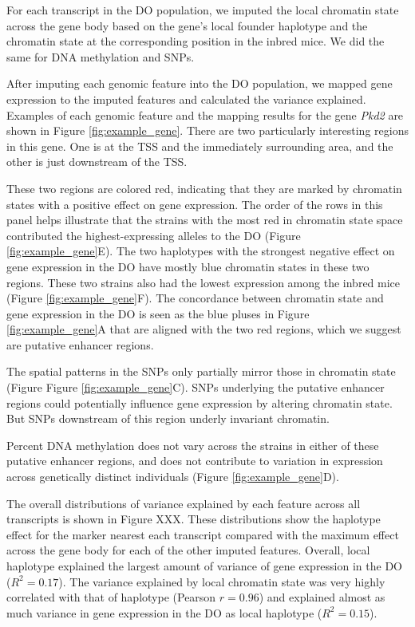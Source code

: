 \documentclass[10pt,letterpaper]{article}
\begin{document}
For each transcript in the DO population, we imputed the local chromatin
state across the gene body based on the gene's local founder haplotype
and the chromatin state at the corresponding position in the inbred
mice. We did the same for DNA methylation and SNPs.

After imputing each genomic feature into the DO population, we mapped
gene expression to the imputed features and calculated the variance
explained. Examples of each genomic feature and the mapping results for
the gene \textit{Pkd2} are shown in Figure \ref{fig:example_gene}. There
are two particularly interesting regions in this gene. One is at the TSS
and the immediately surrounding area, and the other is just downstream
of the TSS.

These two regions are colored red, indicating that they are marked by
chromatin states with a positive effect on gene expression. The order of
the rows in this panel helps illustrate that the strains with the most
red in chromatin state space contributed the highest-expressing alleles
to the DO (Figure \ref{fig:example_gene}E). The two haplotypes with the
strongest negative effect on gene expression in the DO have mostly blue
chromatin states in these two regions. These two strains also had the
lowest expression among the inbred mice (Figure
\ref{fig:example_gene}F). The concordance between chromatin state and
gene expression in the DO is seen as the blue pluses in Figure
\ref{fig:example_gene}A that are aligned with the two red regions, which
we suggest are putative enhancer regions.

The spatial patterns in the SNPs only partially mirror those in
chromatin state (Figure Figure \ref{fig:example_gene}C). SNPs underlying
the putative enhancer regions could potentially influence gene
expression by altering chromatin state. But SNPs downstream of this
region underly invariant chromatin.

Percent DNA methylation does not vary across the strains in either of
these putative enhancer regions, and does not contribute to variation in
expression across genetically distinct individuals (Figure
\ref{fig:example_gene}D).

The overall distributions of variance explained by each feature across
all transcripts is shown in Figure XXX. These distributions show the
haplotype effect for the marker nearest each transcript compared with
the maximum effect across the gene body for each of the other imputed
features. Overall, local haplotype explained the largest amount of
variance of gene expression in the DO (\(R^2 = 0.17\)). The variance
explained by local chromatin state was very highly correlated with that
of haplotype (Pearson \(r = 0.96\)) and explained almost as much
variance in gene expression in the DO as local haplotype
(\(R^2 = 0.15\)).
\end{document}
